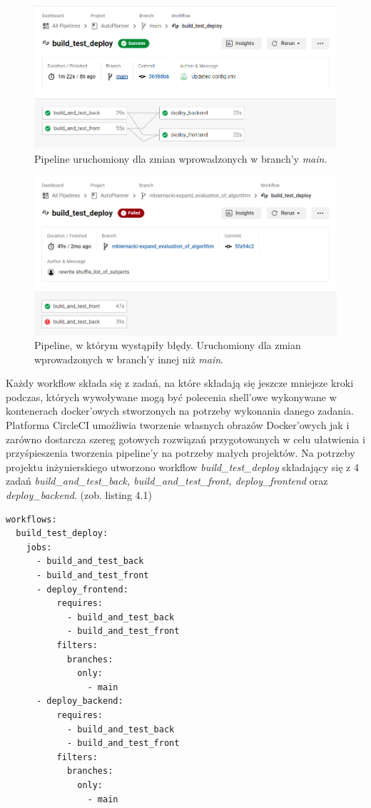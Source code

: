 \begin{figure}[H]
\centering\includegraphics[width=\textwidth]{figures/ppl_flow}
\caption{Pipeline uruchomiony dla zmian wprowadzonych w branch'y \textit{main}.}
\end{figure}

\begin{figure}[H]
\centering\includegraphics[width=\textwidth]{figures/ppl_flow_fail}
\caption{Pipeline, w którym wystąpiły błędy. Uruchomiony dla zmian wprowadzonych w branch'y innej niż \textit{main}.}
\end{figure}

	Każdy workflow składa się z zadań, na które składają się jeszcze mniejsze kroki podczas, których wywoływane mogą być polecenia shell'owe wykonywane w kontenerach docker'owych stworzonych na potrzeby wykonania danego zadania. Platforma CircleCI umożliwia tworzenie własnych obrazów Docker'owych jak i zarówno dostarcza szereg gotowych rozwiązań przygotowanych w celu ułatwienia i przyśpieszenia tworzenia pipeline'y na potrzeby małych projektów. Na potrzeby projektu inżynierskiego utworzono workflow \textit{build\_test\_deploy} składający się z 4 zadań \textit{build\_and\_test\_back, build\_and\_test\_front, deploy\_frontend} oraz \textit{deploy\_backend}. (zob. listing 4.1) 
\begin{lstlisting}[caption=Część skryptu config.yml odpowiedzialna za określenie przebiegu workflow'u.]
workflows:
  build_test_deploy:
    jobs:
      - build_and_test_back
      - build_and_test_front
      - deploy_frontend:
          requires:
            - build_and_test_back
            - build_and_test_front
          filters:
            branches:
              only:
                - main
      - deploy_backend:
          requires:
            - build_and_test_back
            - build_and_test_front
          filters:
            branches:
              only:
                - main
\end{lstlisting} 

